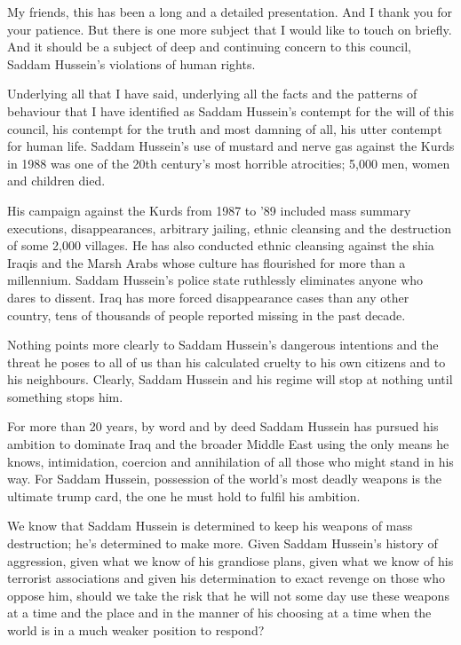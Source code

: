 \documentclass[10pt,a4paper]{article}
\begin{document}
My friends, this has been a long and a detailed presentation. And I thank you for your patience. But there is one more subject that I would like to touch on briefly. And it should be a subject of deep and continuing concern to this council, Saddam Hussein's violations of human rights.

Underlying all that I have said, underlying all the facts and the patterns of behaviour that I have identified as Saddam Hussein's contempt for the will of this council, his contempt for the truth and most damning of all, his utter contempt for human life. Saddam Hussein's use of mustard and nerve gas against the Kurds in 1988 was one of the 20th century's most horrible atrocities; 5,000 men, women and children died.

His campaign against the Kurds from 1987 to '89 included mass summary executions, disappearances, arbitrary jailing, ethnic cleansing and the destruction of some 2,000 villages. He has also conducted ethnic cleansing against the shia Iraqis and the Marsh Arabs whose culture has flourished for more than a millennium. Saddam Hussein's police state ruthlessly eliminates anyone who dares to dissent. Iraq has more forced disappearance cases than any other country, tens of thousands of people reported missing in the past decade.

Nothing points more clearly to Saddam Hussein's dangerous intentions and the threat he poses to all of us than his calculated cruelty to his own citizens and to his neighbours. Clearly, Saddam Hussein and his regime will stop at nothing until something stops him.

For more than 20 years, by word and by deed Saddam Hussein has pursued his ambition to dominate Iraq and the broader Middle East using the only means he knows, intimidation, coercion and annihilation of all those who might stand in his way. For Saddam Hussein, possession of the world's most deadly weapons is the ultimate trump card, the one he must hold to fulfil his ambition.

We know that Saddam Hussein is determined to keep his weapons of mass destruction; he's determined to make more. Given Saddam Hussein's history of aggression, given what we know of his grandiose plans, given what we know of his terrorist associations and given his determination to exact revenge on those who oppose him, should we take the risk that he will not some day use these weapons at a time and the place and in the manner of his choosing at a time when the world is in a much weaker position to respond?
\end{document}
